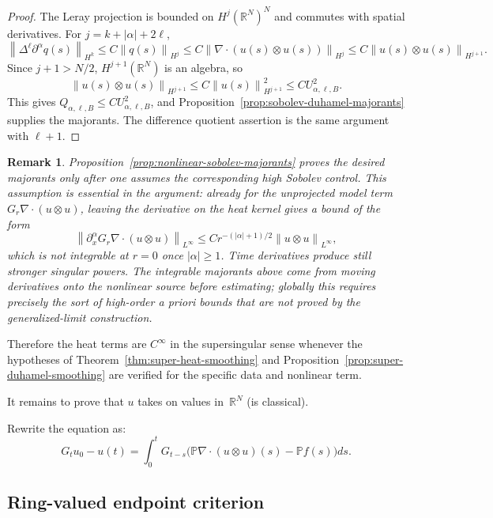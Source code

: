 \documentclass{amsart}
\newtheorem{rem}{Remark}
\newcommand{\norm}[1]{\left\lVert #1\right\rVert}
\newcommand{\abs}[1]{\left\lvert #1\right\rvert}
\begin{document}
\begin{proof}
The Leray projection is bounded on $H^j(\mathbb{R}^N)^N$ and commutes with
spatial derivatives.  For $j=k+\abs{\alpha}+2\ell$,
\[
  \norm{\Delta^\ell\partial^\alpha q(s)}_{H^k}
  \leq
  C\norm{q(s)}_{H^j}
  \leq
  C\norm{\nabla\cdot(u(s)\otimes u(s))}_{H^j}
  \leq
  C\norm{u(s)\otimes u(s)}_{H^{j+1}} .
\]
Since $j+1>N/2$, $H^{j+1}(\mathbb{R}^N)$ is an algebra, so
\[
  \norm{u(s)\otimes u(s)}_{H^{j+1}}
  \leq C\norm{u(s)}_{H^{j+1}}^2
  \leq C U_{\alpha,\ell,B}^2 .
\]
This gives $Q_{\alpha,\ell,B}\leq C U_{\alpha,\ell,B}^2$, and
Proposition~\ref{prop:sobolev-duhamel-majorants} supplies the majorants.  The
difference quotient assertion is the same argument with $\ell+1$.
\end{proof}

\begin{rem}
Proposition~\ref{prop:nonlinear-sobolev-majorants} proves the desired majorants
only after one assumes the corresponding high Sobolev control.  This assumption
is essential in the argument: already for the unprojected model term
$G_r\nabla\cdot(u\otimes u)$, leaving the derivative on the heat kernel gives a
bound of the form
\[
  \norm{\partial_x^\alpha G_r\nabla\cdot(u\otimes u)}_{L^\infty}
  \leq C r^{-(\abs{\alpha}+1)/2}
  \norm{u\otimes u}_{L^\infty},
\]
which is not integrable at $r=0$ once $\abs{\alpha}\geq1$.  Time derivatives
produce still stronger singular powers.  The integrable majorants above come
from moving derivatives onto the nonlinear source before estimating; globally
this requires precisely the sort of high-order a priori bounds that are not
proved by the generalized-limit construction.
\end{rem}

Therefore the heat terms are $C^\infty$ in the supersingular sense whenever
the hypotheses of Theorem~\ref{thm:super-heat-smoothing} and
Proposition~\ref{prop:super-duhamel-smoothing} are verified for the specific
data and nonlinear term.

It remains to prove that $u$ takes on values in~$\mathbb{R}^N$ (is classical).

Rewrite the equation as:
\begin{equation}\label{to-classical}
G_t u_0 - u(t) = \int_0^t G_{t-s} \bigl(\mathbb{P}\nabla\cdot(u\otimes u)(s) - \mathbb{P}f(s)\bigr)ds.
\end{equation}

\subsection{Ring-valued endpoint criterion}
\end{document}
